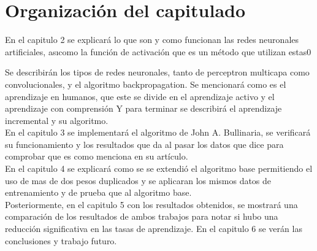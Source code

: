 \chapter{Organización del capitulado}
 
 
	 En el capitulo 2 se explicar\'a lo que son y como funcionan las redes neuronales artificiales, as\i como la función de activación que es un método que utilizan estas0

	 Se describir\'an los tipos de redes neuronales, tanto de perceptron multicapa como convolucionales, y el algoritmo backpropagation.
	 Se mencionar\'a como es el aprendizaje en humanos, que este se divide en el aprendizaje activo y el aprendizaje con comprensión
	 Y para terminar se describirá el aprendizaje incremental y su algoritmo.\\
	 
	 En el capitulo 3 se implementar\'a el algoritmo de John A. Bullinaria, se verificar\'a su funcionamiento y los resultados que da al pasar los datos que dice para comprobar que es como menciona en su art\'iculo.\\
	 En el capitulo 4 se explicar\'a como se se extendió el algoritmo base permitiendo el uso de mas de dos pesos duplicados y se aplicaran los mismos datos de entrenamiento y de prueba que al algoritmo base.\\
	 
	 Posteriormente, en el capitulo 5 con los resultados obtenidos, se mostrar\'a una comparación de los resultados de ambos trabajos para notar si hubo una reducción significativa en las tasas de aprendizaje. En el capitulo 6 se verán las conclusiones y trabajo futuro.